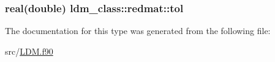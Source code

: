 \hypertarget{structldm__class_1_1redmat_a84dbf8ac876c4a77ee0f4d7a7dd0ed3e}{
\subsubsection[{tol}]{\setlength{\rightskip}{0pt plus 5cm}real(double) ldm\+\_\+class\+::redmat\+::tol\hspace{0.3cm}{\ttfamily [private]}}}\label{structldm__class_1_1redmat_a84dbf8ac876c4a77ee0f4d7a7dd0ed3e}


The documentation for this type was generated from the following file\+:\begin{DoxyCompactItemize}
\item 
src/\hyperlink{_l_d_m_8f90}{L\+D\+M.\+f90}\end{DoxyCompactItemize}
